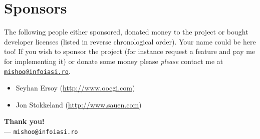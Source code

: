 \documentclass[a4paper,10pt]{article}
\begin{document}
\section{Sponsors}

The following people either sponsored, donated money to the project or bought
developer licenses (listed in reverse chronological order).  Your name could be here
too!  If you wish to sponsor the project (for instance request a feature and
pay me for implementing it) or donate some money please
\emph{please} contact me at \texttt{\href{mailto:mishoo@infoiasi.ro}{mishoo@infoiasi.ro}}.

\begin{itemize}

\item Seyhan Ersoy ({\href{http://www.oocgi.com}{http://www.oocgi.com}})

\item Jon Stokkeland ({\href{http://www.sauen.com}{http://www.sauen.com}})

\end{itemize}

\begin{flushright}
\textbf{Thank you!}\\
--- \texttt{mishoo@infoiasi.ro}
\end{flushright}
\end{document}
